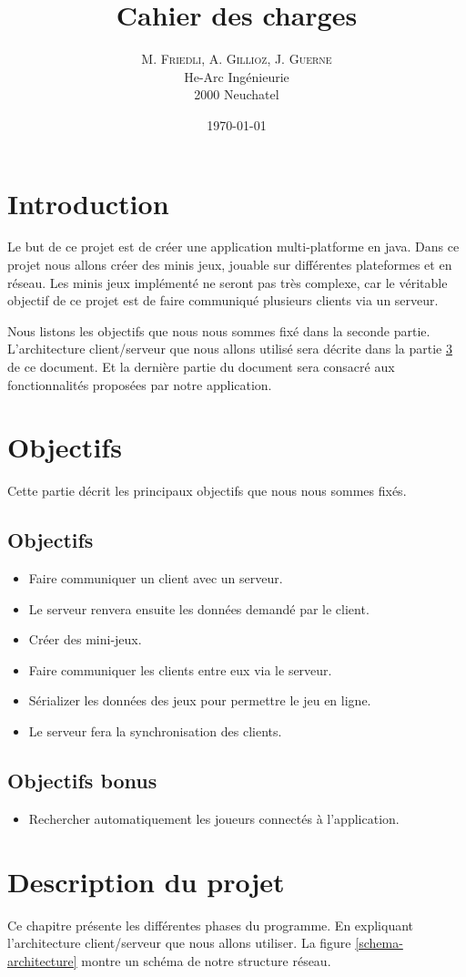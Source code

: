 \documentclass{report}
\title{Cahier des charges}
\author{M. \textsc{Friedli}, A. \textsc{Gillioz}, J. \textsc{Guerne}\\
He-Arc Ingénieurie\\
2000 Neuchatel}
\date{\today{}}
\begin{document}
\maketitle{}
\chapter{Introduction}
Le but de ce projet est de créer une application multi-platforme en java. Dans ce projet nous allons créer des minis jeux, jouable sur différentes plateformes et en réseau. Les minis jeux implémenté
ne seront pas très complexe, car le véritable objectif de ce projet est de faire communiqué plusieurs clients via un serveur.\par
Nous listons les objectifs que nous nous sommes fixé dans la seconde partie. L'architecture client/serveur que nous allons utilisé sera décrite dans la partie \ref{desciption-projet} de ce document.
Et la dernière partie du document sera consacré aux fonctionnalités proposées par notre application.
\chapter{Objectifs}
Cette partie décrit les principaux objectifs que nous nous sommes fixés.
\section{Objectifs}\label{objectifs}
\begin{itemize}
	\item Faire communiquer un client avec un serveur.
	\item Le serveur renvera ensuite les données demandé par le client.
	\item Créer des mini-jeux.
	\item Faire communiquer les clients entre eux via le serveur.
	\item Sérializer les données des jeux pour permettre le jeu en ligne.
	\item Le serveur fera la synchronisation des clients.
\end{itemize}
\section{Objectifs bonus}\label{objectifs-bonus}
\begin{itemize}
	\item Rechercher automatiquement les joueurs connectés à l'application.
\end{itemize}
\chapter{Description du projet}\label{desciption-projet}
Ce chapitre présente les différentes phases du programme. En expliquant l'architecture client/serveur que nous allons utiliser. La figure \ref{schema-architecture} montre un schéma de notre
structure réseau.
\end{document}
